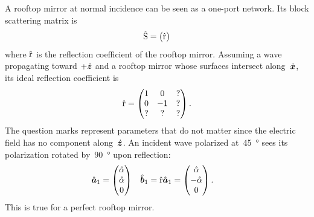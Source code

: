 A rooftop mirror at normal incidence can be seen as a one-port network.
Its block scattering matrix is
\begin{equation}
    \hat{\mathrm{S}} =
    \begin{pmatrix}
        \hat{\mathrm{r}}
    \end{pmatrix}
\end{equation}
where $\hat{\mathrm{r}}$ is the reflection coefficient of the rooftop mirror.
Assuming a wave propagating toward $+\dot{\bm{z}}$ and a rooftop mirror whose surfaces intersect along~$\dot{\bm{x}}$,
its ideal reflection coefficient is
\begin{equation}
    \hat{\mathrm{r}} =
    \begin{pmatrix}
        1 &  0 & ?\\
        0 & -1 & ?\\
        ? &  ? & ?
    \end{pmatrix}
    \text{.}
\end{equation}
The question marks represent parameters that do not matter since the electric field has no component along~$\dot{\bm{z}}$.
An incident wave polarized at~\SI{45}{\degree} sees its polarization rotated by~\SI{90}{\degree} upon reflection:
\begin{align}
    \hat{\bm{a}}_1
    &=
    \begin{pmatrix}
        \hat{\alpha} \\ \hat{\alpha} \\ 0
    \end{pmatrix}
    &
    \hat{\bm{b}}_1
    &= \hat{\mathrm{r}} \hat{\bm{a}}_1
    =
    \begin{pmatrix}
        \hat{\alpha} \\ -\hat{\alpha} \\ 0
    \end{pmatrix}
    \text{.}
\end{align}
This is true for a perfect rooftop mirror.


